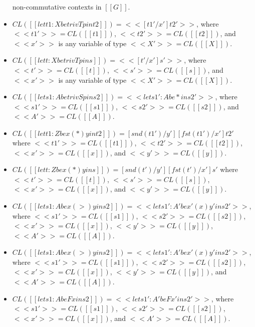 \begin{definition}
\begin{itemize}
        non-commutative contexts in $[[G]]$.
  \item $CL([[let t1 : X be trivTp in t2]]) = << [ t1' / x' ] t2' >>$,
        where $<<t1'>> = CL([[t1]])$, $<<t2'>> = CL([[t2]])$, and $<<x'>>$
        is any variable of type $<<X'>> = CL([[X]])$.
  \item $CL([[let t : X be trivTp in s]]) = << [ t' / x' ] s' >>$,
        where $<<t'>> = CL([[t]])$, $<<s'>> = CL([[s]])$, and $<<x'>>$
        is any variable of type $<<X'>> = CL([[X]])$.
  \item $CL([[let s1 : A be trivSp in s2]]) = <<let s1' : A be * in s2'>>$,
        where $<<s1'>> = CL([[s1]])$, $<<s2'>> = CL([[s2]])$, and
        $<<A'>> = CL([[A]])$.
  \item $CL([[let t1 : Z be x (*) y in t2]]) = [snd(t1') / y'][fst(t1') / x']t2'$
        where $<<t1'>> = CL([[t1]])$, $<<t2'>> = CL([[t2]])$,
        $<<x'>> = CL([[x]])$, and $<<y'>> = CL([[y]])$.
  \item $CL([[let t : Z be x (*) y in s]]) = [snd(t') / y'][fst(t') / x']s'$
        where $<<t'>> = CL([[t]])$, $<<s'>> = CL([[s]])$,
        $<<x'>> = CL([[x]])$, and $<<y'>> = CL([[y]])$.
  \item $CL([[let s1 : A be x (>) y in s2]]) = <<let s1' : A' be x' (x) y' in s2'>>$,
        where $<<s1'>> = CL([[s1]])$, $<<s2'>> = CL([[s2]])$,
        $<<x'>> = CL([[x]])$, $<<y'>> = CL([[y]])$, $<<A'>> = CL([[A]])$.
  \item $CL([[let s1 : A be x (>) y in s2]]) = <<let s1' : A' be x' (x) y' in s2'>>$,
        where $<<s1'>> = CL([[s1]])$, $<<s2'>> = CL([[s2]])$,
        $<<x'>> = CL([[x]])$, $<<y'>> = CL([[y]])$, and
        $<<A'>> = CL([[A]])$.
  \item $CL([[let s1 : A be F x in s2]]) = <<let s1' : A' be F x' in s2'>>$,
        where $<<s1'>> = CL([[s1]])$, $<<s2'>> = CL([[s2]])$,
        $<<x'>> = CL([[x]])$, and $<<A'>> = CL([[A]])$.
  \end{itemize}
\end{definition}

